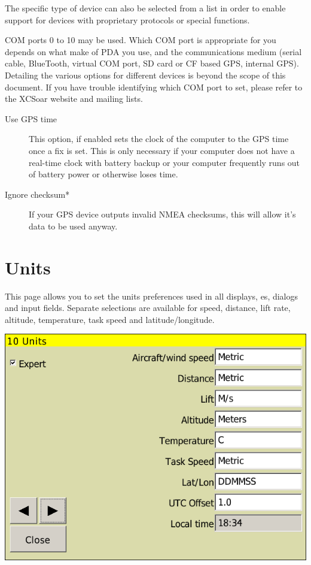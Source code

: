 The specific type of device can also be selected from a list in order
to enable support for devices with proprietary protocols or special
functions.

COM ports 0 to 10 may be used.  Which COM port is appropriate for you
depends on what make of PDA you use, and the communications medium
(serial cable, BlueTooth, virtual COM port, SD card or CF based GPS,
internal GPS).  Detailing the various options for different devices is
beyond the scope of this document.  If you have trouble identifying
which COM port to set, please refer to the XCSoar website and mailing
lists.

\begin{description}
\item[Use GPS time] This option, if enabled sets the clock of the computer to the GPS time once a fix is set.  
This is only necessary if your computer does not have a real-time clock with battery backup or your computer 
frequently runs out of battery power or otherwise loses time.
\item[Ignore checksum*] If your GPS device outputs invalid NMEA checksums, this will allow it's data to be used anyway.
\end{description}

\clearpage
\section{Units}

This page allows you to set the units preferences used in all
displays, {\InfoBox}es, dialogs and input fields.  Separate selections
are available for speed, distance, lift rate, altitude, temperature, task
speed and latitude/longitude.

\begin{center}
\includegraphics[angle=0,width=0.8\linewidth,keepaspectratio='true']{figures/config-units.png}
\end{center}

